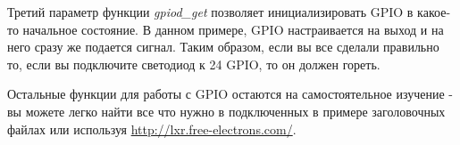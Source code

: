 Третий параметр функции \emph{gpiod\_get} позволяет инициализировать GPIO в
какое-то начальное состояние. В данном примере, GPIO настраивается на выход и
на него сразу же подается сигнал. Таким образом, если вы все сделали правильно
то, если вы подключите светодиод к 24 GPIO, то он должен гореть.

Остальные функции для работы с GPIO остаются на самостоятельное изучение - вы
можете легко найти все что нужно в подключенных в примере заголовочных файлах
или используя \url{http://lxr.free-electrons.com/}.
